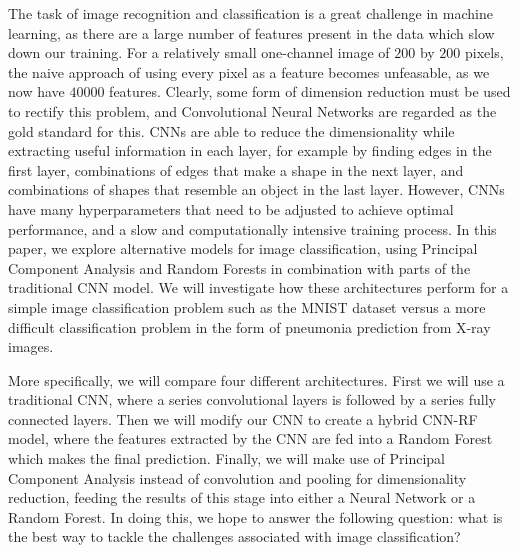 \documentclass[onecolumn,10pt,cleanfoot]{asme2ej}
\begin{document}
The task of image recognition and classification is a great challenge in machine learning, as there are a large number of features present in the data which slow down our training. For a relatively small one-channel image of $200$ by $200$ pixels, the naive approach of using every pixel as a feature becomes unfeasable, as we now have $40000$ features. Clearly, some form of dimension reduction must be used to rectify this problem, and Convolutional Neural Networks are regarded as the gold standard for this. CNNs are able to reduce the dimensionality while extracting useful information in each layer, for example by finding edges in the first layer, combinations of edges that make a shape in the next layer, and combinations of shapes that resemble an object in the last layer. However, CNNs have many hyperparameters that need to be adjusted to achieve optimal performance, and a slow and computationally intensive training process. In this paper, we explore alternative models for image classification, using Principal Component Analysis and Random Forests in combination with parts of the traditional CNN model. We will investigate how these architectures perform for a simple image classification problem such as the MNIST dataset versus a more difficult classification problem in the form of pneumonia prediction from X-ray images. 

More specifically, we will compare four different architectures. First we will use a traditional CNN, where a series convolutional layers is followed by a series fully connected layers. Then we will modify our CNN to create a hybrid CNN-RF model, where the features extracted by the CNN are fed into a Random Forest which makes the final prediction. Finally, we will make use of Principal Component Analysis instead of convolution and pooling for dimensionality reduction, feeding the results of this stage into either a Neural Network or a Random Forest. In doing this, we hope to answer the following question: what is the best way to tackle the challenges associated with image classification?

\end{document}
